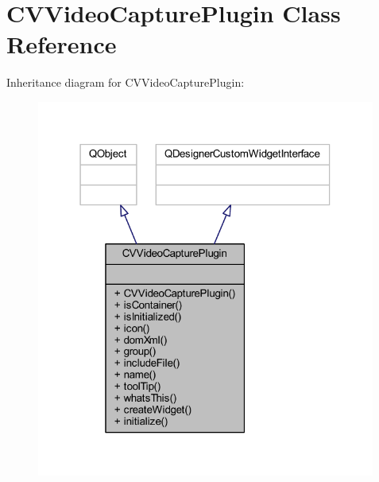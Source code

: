 \hypertarget{class_c_v_video_capture_plugin}{}\section{C\+V\+Video\+Capture\+Plugin Class Reference}
\label{class_c_v_video_capture_plugin}


Inheritance diagram for C\+V\+Video\+Capture\+Plugin\+:\nopagebreak
\begin{figure}[H]
\begin{center}
\leavevmode
\includegraphics[width=316pt]{d0/d81/class_c_v_video_capture_plugin__inherit__graph}
\end{center}
\end{figure}


